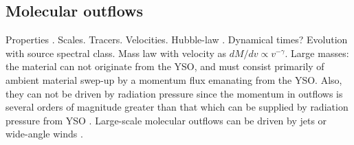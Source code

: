 \documentclass[12pt]{mythesis}
\begin{document}
\subsection{Molecular outflows}

Properties \citep[e.g.][]{lada1985, cabrit1997, bally2007, arce2007, bally2016}. Scales. Tracers. Velocities. Hubble-law \citep{lada1996}. Dynamical times? Evolution with source spectral class. Mass law with velocity as $dM/dv\propto v^{-\gamma}$. Large masses: the material can not originate from the YSO, and must consist primarily of ambient material swep-up by a momentum flux emanating from the YSO. Also, they can not be driven by radiation pressure since the momentum in outflows is several orders of magnitude greater than that which can be supplied by radiation pressure from YSO \citep{bally1983}. Large-scale molecular outflows can be driven by jets or wide-angle winds \citep{lee2000, lee2001, arce2007}.

\end{document}
